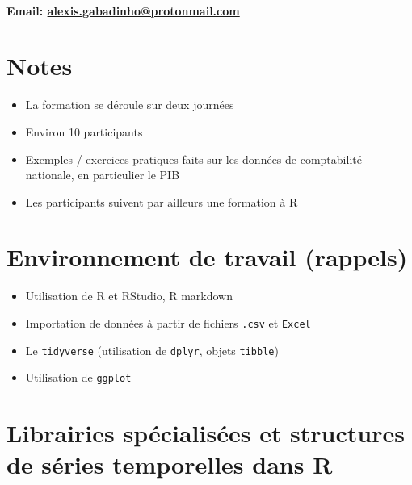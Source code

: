 \documentclass{article}
\begin{document}
\maketitle


\hline
\vspace{0.5cm}
 \\
\textbf{Email: \href{mailto:alexis.gabadinho@protonmail.com}{alexis.gabadinho@protonmail.com}} \\
\hline                                   
\vspace{0.5cm}

\section*{Notes}

\begin{itemize}[noitemsep]
\item La formation se déroule sur deux journées
\item Environ 10 participants
\item Exemples / exercices pratiques faits sur les données de comptabilité nationale, en particulier le PIB
\item Les participants suivent par ailleurs une formation à R
\end{itemize}

\section{Environnement de travail (rappels)}

\begin{itemize}[noitemsep]
\item Utilisation de R et RStudio, R markdown
\item Importation de données à partir de fichiers \texttt{.csv} et \texttt{Excel}
\item Le \texttt{tidyverse} (utilisation de \texttt{dplyr}, objets \texttt{tibble})
\item Utilisation de \texttt{ggplot}
\end{itemize}

\section{Librairies spécialisées et structures de séries temporelles dans R}
\end{document}

